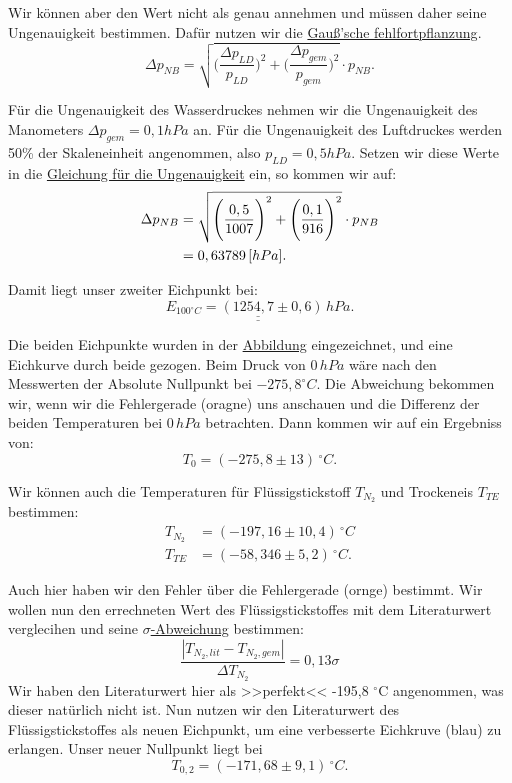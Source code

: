 Wir können aber den Wert nicht als genau annehmen und müssen daher seine Ungenauigkeit bestimmen. Dafür nutzen wir die \hyperref[eq:gauss_fehlfortpflanzung]{Gauß'sche fehlfortpflanzung}.
\begin{equation}
    \Delta p_{NB} = \sqrt{\Bigg(\frac{\Delta p_{LD}}{p_{LD}}\Bigg)^2 + \Bigg(\frac{\Delta p_{gem}}{p_{gem}}\Bigg)^2} \cdot p_{NB}.
    \label{eq:Ungenauigkeit_p-nb}
\end{equation}

Für die Ungenauigkeit des Wasserdruckes nehmen wir die Ungenauigkeit des Manometers $\Delta p_{gem} = 0,1 hPa$ an. Für die  Ungenauigkeit des Luftdruckes werden 50\% der Skaleneinheit angenommen, also $p_{LD} = 0,5hPa$.
Setzen wir diese Werte in die \hyperref[eq:Ungenauigkeit_p-nb]{Gleichung für die Ungenauigkeit} ein, so kommen wir auf:
\begin{align}
    \Delta p_{NB} &= \sqrt{\Bigg(\frac{0,5}{1007}\Bigg)^2 + \Bigg(\frac{0,1}{916}\Bigg)^2} \cdot p_{NB} \notag \\
     &= 0,63789 \, [hPa].
\end{align}

Damit liegt unser zweiter Eichpunkt bei:
\begin{equation}
    \underline{\underline{E_{100^\circ C} = (1254,7 \pm 0,6) \, hPa}}.
\end{equation}

Die beiden Eichpunkte wurden in der \hyperref[fig:graphisch_temp_druck]{Abbildung} eingezeichnet, und eine Eichkurve durch beide gezogen. Beim Druck von $0 \, hPa$ wäre nach den Messwerten der Absolute Nullpunkt bei $-275,8^\circ C$.
Die Abweichung bekommen wir, wenn wir die Fehlergerade (oragne) uns anschauen und die Differenz der beiden Temperaturen bei $0 \, hPa$ betrachten. Dann kommen wir auf ein Ergebniss von:
\begin{equation}
    T_0 = (-275,8 \pm 13)  \, ^\circ C.
\end{equation}

Wir können auch die Temperaturen für Flüssigstickstoff $T_{N_2}$ und Trockeneis $T_{TE}$ bestimmen:
\begin{align}
    T_{N_2} &= (-197,16 \pm 10,4) \, ^\circ C \\
    T_{TE} &= (-58,346 \pm 5,2) \, ^\circ C.
\end{align}

Auch hier haben wir den Fehler über die Fehlergerade (ornge) bestimmt. 
Wir wollen nun den errechneten Wert des Flüssigstickstoffes mit dem Literaturwert verglecihen und seine \hyperref[eq:signifikante_abweichung]{$\sigma$-Abweichung} bestimmen:
\begin{equation}
    \frac{\left| T_{N_2,lit} - T_{N_2,gem} \right|}{\Delta T_{N_2}} = 0,13\sigma
\end{equation}
Wir haben den Literaturwert hier als >>perfekt<< -195,8 $^\circ$C angenommen, was dieser natürlich nicht ist. 
Nun nutzen wir den Literaturwert des Flüssigstickstoffes als neuen Eichpunkt, um eine verbesserte Eichkruve (blau) zu erlangen.
Unser neuer Nullpunkt liegt bei
\begin{equation}
    T_{0,2} = (-171,68 \pm 9,1) \, ^\circ C.
\end{equation}

